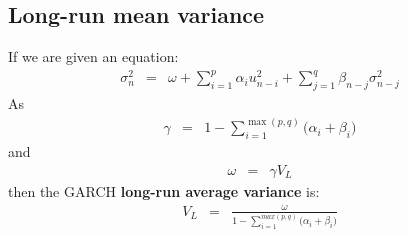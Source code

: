 \subsection{Long-run mean variance}
If we are given an equation:
\begin{eqnarray}
	\sigma_{n}^{2} &=& \omega + \sum_{i = 1}^{p}\alpha_{i}u_{n - i}^{2} + \sum_{j = 1}^{q}\beta_{n - j}\sigma_{n - j}^{2}
\end{eqnarray}
As
\begin{eqnarray}
	\gamma &=& 1 - \sum_{i = 1}^{\max(p, q)}\big(\alpha_{i} + \beta_{i}\big)
\end{eqnarray}
and
\begin{eqnarray}
	\omega &=& \gamma V_{L}
\end{eqnarray}
then the GARCH \textbf{\color{blue}long-run average variance} is:
\begin{eqnarray}
	V_{L} &=& \frac{\omega}{1 - \sum_{i = 1}^{max(p, q)}\big(\alpha_{i} + \beta_{i}\big)}
\end{eqnarray}